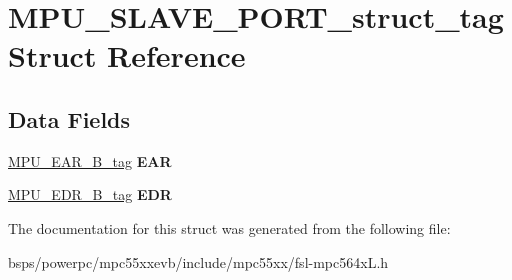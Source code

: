 \hypertarget{structMPU__SLAVE__PORT__struct__tag}{}\section{M\+P\+U\+\_\+\+S\+L\+A\+V\+E\+\_\+\+P\+O\+R\+T\+\_\+struct\+\_\+tag Struct Reference}
\label{structMPU__SLAVE__PORT__struct__tag}
\subsection*{Data Fields}
\begin{DoxyCompactItemize}
\item 
\mbox{\label{structMPU__SLAVE__PORT__struct__tag_ab0a0fb81c5ad3f025a52839d9d6e9c2f}} 
\mbox{\hyperlink{unionMPU__EAR__32B__tag}{M\+P\+U\+\_\+\+E\+A\+R\+\_\+B\+\_\+tag}} {\bfseries E\+AR}
\item 
\mbox{\label{structMPU__SLAVE__PORT__struct__tag_ad7635f29f9e1c581419ee55d29167b01}} 
\mbox{\hyperlink{unionMPU__EDR__32B__tag}{M\+P\+U\+\_\+\+E\+D\+R\+\_\+B\+\_\+tag}} {\bfseries E\+DR}
\end{DoxyCompactItemize}


The documentation for this struct was generated from the following file\+:\begin{DoxyCompactItemize}
\item 
bsps/powerpc/mpc55xxevb/include/mpc55xx/fsl-\/mpc564x\+L.\+h\end{DoxyCompactItemize}
